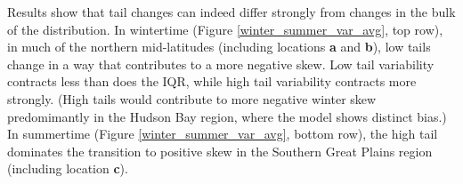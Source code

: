 \documentclass{ametsoc}
\begin{document}
Results show that tail changes can indeed differ strongly from changes in the bulk of the distribution.  In wintertime (Figure \ref{winter_summer_var_avg}, top row), in much of the northern mid-latitudes (including locations \textbf{a} and \textbf{b}), low tails change in a way that contributes to a more negative skew. Low tail variability contracts less than does the IQR, while high tail variability contracts more strongly. (High tails would contribute to more negative winter skew predomimantly in the Hudson Bay region, where the model shows distinct bias.) In summertime (Figure \ref{winter_summer_var_avg}, bottom row), the high tail dominates the transition to positive skew in the Southern Great Plains region (including location \textbf{c}).

\end{document}

